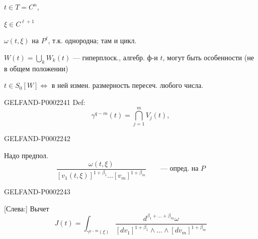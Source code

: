 $t\in T=C^n$,

$\xi\in C^{\ell+1}$



$\omega(t,\xi)$ на $P^\ell$, т.к. однородна; там и цикл.





$W(t)=\bigcup_k W_k(t)$ — гиперплоск., алгебр. ф-и $t$, могут быть особенности (не в общем положении)



$t\in S_0[W]\Longleftrightarrow$ в ней измен. размерность пересеч. любого числа.



\begin{GelfandAdjacentEvidence}{GELFAND-P000224}{1}
Def:
\begin{equation*}
 \gamma^{q-m}(t)=\bigcap_{j=1}^m V_j(t),
\end{equation*}
\end{GelfandAdjacentEvidence}

\begin{center}
\end{center}



\begin{GelfandAdjacentEvidence}{GELFAND-P000224}{2}

Надо предпол.
\begin{equation*}
 \frac{\omega(t,\xi)}{[v_1(t,\xi)]^{1+\beta_1}\ldots[v_m]^{1+\beta_m}}
 \qquad\text{— опред. на }P
\end{equation*}
\end{GelfandAdjacentEvidence}
\begin{GelfandAdjacentEvidence}{GELFAND-P000224}{3}

[Слева:] Вычет
\begin{equation*}
 J(t)=\int_{\gamma^{q-m}(\xi)}
 \frac{d^{\beta_1+\ldots+\beta_m}\omega}
 {[dv_1]^{1+\beta_1}\wedge\ldots\wedge[dv_m]^{1+\beta_m}}
\end{equation*}
\end{GelfandAdjacentEvidence}




